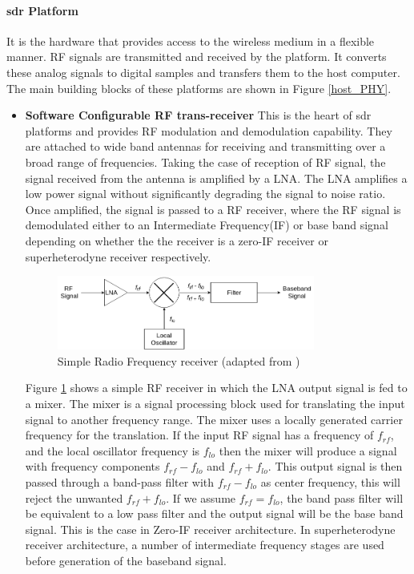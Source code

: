\paragraph{\ac{sdr} Platform} It is the hardware that provides access to the wireless medium in a flexible manner.
\ac{RF} signals are transmitted and received by the platform.
It converts these analog signals to digital samples and transfers them to the host computer.
The main building blocks of these platforms are shown in Figure \ref{host_PHY}.
\begin{itemize}
\item{\textbf{Software Configurable \ac{RF} trans-receiver}}  This is the heart of \ac{sdr} platforms and provides \ac{RF} modulation and demodulation capability.
They are attached to wide band antennas for receiving and transmitting over a broad range of frequencies.
Taking the case of reception of RF signal, the signal received from the antenna is amplified by a \ac{LNA}.
The \ac{LNA} amplifies a low power signal without significantly degrading the signal to noise ratio.
Once amplified, the signal is passed to a \ac{RF} receiver, where the \ac{RF} signal is demodulated either to an Intermediate Frequency(IF) or base band signal depending on whether the the receiver is a zero-IF receiver or superheterodyne receiver respectively.\\

\begin{figure}[h!]
\centering
\includegraphics[width=0.8\textwidth]{Figure/RF_receiver.png}
\caption{Simple Radio Frequency receiver (adapted from \cite{noauthor_differences_2016})}
\label{rf_receiver}
\end{figure}

Figure \ref{rf_receiver} shows a simple \ac{RF} receiver in which the \ac{LNA} output signal is fed to a mixer.
The mixer is a signal processing block used for translating the input signal to another frequency range.
The mixer uses a locally generated carrier frequency for the translation. 
If the input \ac{RF} signal has a frequency of $f_{rf}$, and the local oscillator frequency is $f_{lo}$ then the mixer will produce a signal with frequency components $f_{rf}-f_{lo}$ and $f_{rf}+f_{lo}$.
This output signal is then passed through a band-pass filter with $f_{rf}-f_{lo}$ as center frequency, this will reject the unwanted $f_{rf}+f_{lo}$.
If we assume $f_{rf}=f_{lo}$, the band pass filter will be equivalent to a low pass filter and the output signal will be the base band signal.
This is the case in Zero-IF receiver architecture.
In superheterodyne receiver architecture, a number of intermediate frequency stages are used before generation of the baseband signal.\\


\end{itemize}
